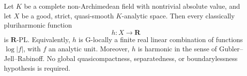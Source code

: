 
\begin{theorem}
\label{thm:p061-quasismooth-ph-rpl}
Let \(K\) be a complete non-Archimedean field with nontrivial absolute
value, and let \(X\) be a good, strict, quasi-smooth \(K\)-analytic space.
Then every classically pluriharmonic function
\[
                             h:X\longrightarrow\mathbf R
\]
is \(\mathbf R\)-PL.  Equivalently, \(h\) is G-locally a finite real
linear combination of functions \(\log|f|\), with \(f\) an analytic unit.
Moreover, \(h\) is harmonic in the sense of
Gubler--Jell--Rabinoff.  No global quasicompactness, separatedness, or
boundarylessness hypothesis is required.
\end{theorem}
